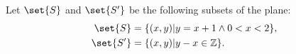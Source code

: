 \documentclass[../main.tex]{subfiles}
\begin{document}
\problem{}\label{s3p5}

Let \(\set{S}\) and \(\set{S'}\) be the following subsets of the plane:
\begin{align*}
	\set{S}  &= \setbuild{(x,y)}{y=x+1 \land 0 < x < 2},\\
	\set{S'} &= \setbuild{(x,y)}{y-x \isin \integers}.
\end{align*}




\end{document}
